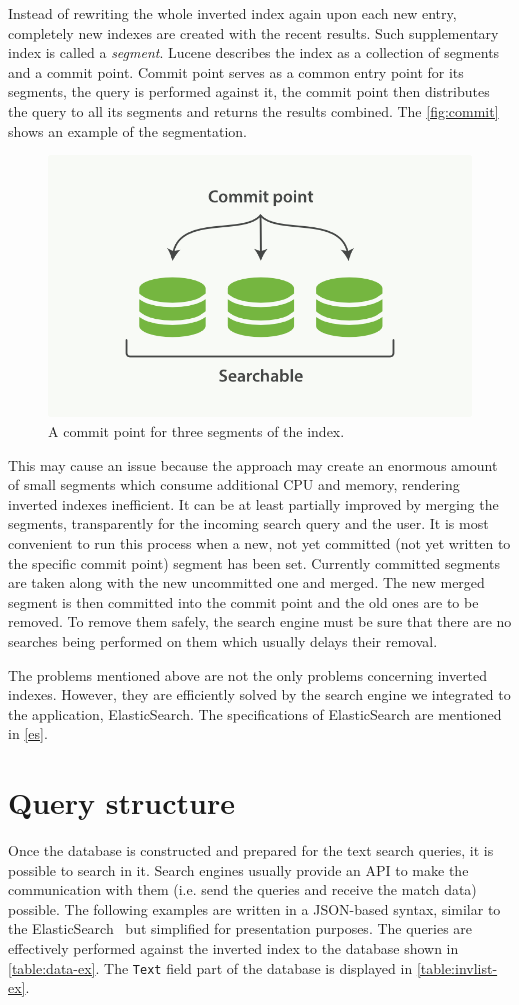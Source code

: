 Instead of rewriting the whole inverted index again upon each new entry, completely new indexes are created with the recent results. Such supplementary index is called a \emph{segment}. Lucene describes the index as a collection of segments and a commit point. Commit point serves as a common entry point for its segments, the query is performed against it, the commit point then distributes the query to all its segments and returns the results combined.
The \autoref{fig:commit} shows an example of the segmentation.
\begin{figure}
\centering
\includegraphics[width=.8\textwidth]{img/commit.png}
\caption{A commit point for three segments of the index.}
\label{fig:commit}
\end{figure}
This may cause an issue because the approach may create an enormous amount of small segments which consume additional CPU and memory, rendering inverted indexes inefficient.
It can be at least partially improved by merging the segments, transparently for the incoming search query and the user. It is most convenient to run this process when a new, not yet committed (not yet written to the specific commit point) segment has been set. Currently committed segments are taken along with the new uncommitted one and merged. The new merged segment is then committed into the commit point and the old ones are to be removed. To remove them safely, the search engine must be sure that there are no searches being performed on them which usually delays their removal.

The problems mentioned above are not the only problems concerning inverted indexes. However, they are efficiently solved by the search engine we integrated to the application, ElasticSearch. The specifications of ElasticSearch are mentioned in \autoref{es}. 

\section{Query structure}
\label{query}
Once the database is constructed and prepared for the text search queries, it is possible to search in it. Search engines usually provide an API to make the communication with them (i.e. send the queries and receive the match data) possible. The following examples are written in a JSON-based syntax, similar to the ElasticSearch~\cite{elastic} but simplified for presentation purposes. The queries are effectively performed against the inverted index to the database shown in \autoref{table:data-ex}. The \texttt{Text} field part of the database is displayed in \autoref{table:invlist-ex}.


